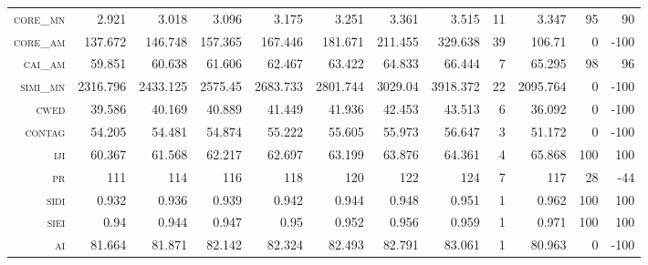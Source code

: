 \begin{landscape}
\begin{table}[!htbp]
\begin{tabular}{@{}rrrrrrrrrrrr@{}}
\textsc{core\_mn  } & 2.921    & 3.018    & 3.096    & 3.175    & 3.251    & 3.361    & 3.515     & 11     & 3.347         & 95             & 90              \\
\textsc{core\_am  } & 137.672  & 146.748  & 157.365  & 167.446  & 181.671  & 211.455  & 329.638   & 39     & 106.71        & 0              & -100            \\
\textsc{cai\_am   } & 59.851   & 60.638   & 61.606   & 62.467   & 63.422   & 64.833   & 66.444    & 7      & 65.295        & 98             & 96              \\
\textsc{simi\_mn  } & 2316.796 & 2433.125 & 2575.45  & 2683.733 & 2801.744 & 3029.04  & 3918.372  & 22     & 2095.764      & 0              & -100            \\
\textsc{cwed      } & 39.586   & 40.169   & 40.889   & 41.449   & 41.936   & 42.453   & 43.513    & 6      & 36.092        & 0              & -100            \\
\textsc{contag    } & 54.205   & 54.481   & 54.874   & 55.222   & 55.605   & 55.973   & 56.647    & 3      & 51.172        & 0              & -100            \\
\textsc{iji       } & 60.367   & 61.568   & 62.217   & 62.697   & 63.199   & 63.876   & 64.361    & 4      & 65.868        & 100            & 100             \\
\textsc{pr        } & 111      & 114      & 116      & 118      & 120      & 122      & 124       & 7      & 117           & 28             & -44             \\
\textsc{sidi      } & 0.932    & 0.936    & 0.939    & 0.942    & 0.944    & 0.948    & 0.951     & 1      & 0.962         & 100            & 100             \\
\textsc{siei      } & 0.94     & 0.944    & 0.947    & 0.95     & 0.952    & 0.956    & 0.959     & 1      & 0.971         & 100            & 100             \\
\textsc{ai        } & 81.664   & 81.871   & 82.142   & 82.324   & 82.493   & 82.791   & 83.061    & 1      & 80.963        & 0              & -100            \\ \bottomrule
\end{tabular}
\end{table}
\end{landscape}


